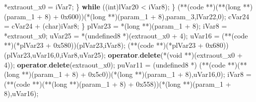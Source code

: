 \documentclass[
]{article}
\newenvironment{Shaded}{}{}
\newcommand{\BaseNTok}[1]{\textcolor[rgb]{0.25,0.63,0.44}{#1}}
\newcommand{\ControlFlowTok}[1]{\textcolor[rgb]{0.00,0.44,0.13}{\textbf{#1}}}
\newcommand{\DataTypeTok}[1]{\textcolor[rgb]{0.56,0.13,0.00}{#1}}
\newcommand{\DecValTok}[1]{\textcolor[rgb]{0.25,0.63,0.44}{#1}}
\newcommand{\KeywordTok}[1]{\textcolor[rgb]{0.00,0.44,0.13}{\textbf{#1}}}
\newcommand{\NormalTok}[1]{#1}
\newcommand{\OperatorTok}[1]{\textcolor[rgb]{0.40,0.40,0.40}{#1}}
\begin{document}
\begin{Shaded}
\begin{Highlighting}[]
        \OperatorTok{*}\NormalTok{extraout\_x0 }\OperatorTok{=}\NormalTok{ iVar7}\OperatorTok{;}
      \OperatorTok{\}} \ControlFlowTok{while} \OperatorTok{((}\DataTypeTok{int}\OperatorTok{)}\NormalTok{lVar20 }\OperatorTok{\textless{}}\NormalTok{ iVar8}\OperatorTok{);}
    \OperatorTok{\}}
    \OperatorTok{(**(}\NormalTok{code }\OperatorTok{**)(**(}\DataTypeTok{long} \OperatorTok{**)(}\NormalTok{param\_1 }\OperatorTok{+} \DecValTok{8}\OperatorTok{)} \OperatorTok{+} \BaseNTok{0x600}\OperatorTok{))(*(}\DataTypeTok{long} \OperatorTok{**)(}\NormalTok{param\_1 }\OperatorTok{+} \DecValTok{8}\OperatorTok{),}\NormalTok{param\_3}\OperatorTok{,}\NormalTok{lVar22}\OperatorTok{,}\DecValTok{0}\OperatorTok{);}
\NormalTok{    cVar24 }\OperatorTok{=}\NormalTok{ cVar24 }\OperatorTok{+} \OperatorTok{(}\DataTypeTok{char}\OperatorTok{)}\NormalTok{iVar8}\OperatorTok{;}
  \OperatorTok{\}}
\NormalTok{  plVar23 }\OperatorTok{=} \OperatorTok{*(}\DataTypeTok{long} \OperatorTok{**)(}\NormalTok{param\_1 }\OperatorTok{+} \DecValTok{8}\OperatorTok{);}
\NormalTok{  iVar8 }\OperatorTok{=} \OperatorTok{*}\NormalTok{extraout\_x0}\OperatorTok{;}
\NormalTok{  uVar25 }\OperatorTok{=} \OperatorTok{*(}\NormalTok{undefined8 }\OperatorTok{*)(}\NormalTok{extraout\_x0 }\OperatorTok{+} \DecValTok{4}\OperatorTok{);}
\NormalTok{  uVar16 }\OperatorTok{=} \OperatorTok{(**(}\NormalTok{code }\OperatorTok{**)(*}\NormalTok{plVar23 }\OperatorTok{+} \BaseNTok{0x580}\OperatorTok{))(}\NormalTok{plVar23}\OperatorTok{,}\NormalTok{iVar8}\OperatorTok{);}
  \OperatorTok{(**(}\NormalTok{code }\OperatorTok{**)(*}\NormalTok{plVar23 }\OperatorTok{+} \BaseNTok{0x680}\OperatorTok{))(}\NormalTok{plVar23}\OperatorTok{,}\NormalTok{uVar16}\OperatorTok{,}\DecValTok{0}\OperatorTok{,}\NormalTok{iVar8}\OperatorTok{,}\NormalTok{uVar25}\OperatorTok{);}
  \KeywordTok{operator}\OperatorTok{.}\KeywordTok{delete}\OperatorTok{(*(}\DataTypeTok{void} \OperatorTok{**)(}\NormalTok{extraout\_x0 }\OperatorTok{+} \DecValTok{4}\OperatorTok{));}
  \KeywordTok{operator}\OperatorTok{.}\KeywordTok{delete}\OperatorTok{(}\NormalTok{extraout\_x0}\OperatorTok{);}
\NormalTok{  puVar11 }\OperatorTok{=} \OperatorTok{(}\NormalTok{undefined8 }\OperatorTok{*)}
            \OperatorTok{(**(}\NormalTok{code }\OperatorTok{**)(**(}\DataTypeTok{long} \OperatorTok{**)(}\NormalTok{param\_1 }\OperatorTok{+} \DecValTok{8}\OperatorTok{)} \OperatorTok{+} \BaseNTok{0x5c0}\OperatorTok{))(*(}\DataTypeTok{long} \OperatorTok{**)(}\NormalTok{param\_1 }\OperatorTok{+} \DecValTok{8}\OperatorTok{),}\NormalTok{uVar16}\OperatorTok{,}\DecValTok{0}\OperatorTok{);}
\NormalTok{  iVar8 }\OperatorTok{=} \OperatorTok{(**(}\NormalTok{code }\OperatorTok{**)(**(}\DataTypeTok{long} \OperatorTok{**)(}\NormalTok{param\_1 }\OperatorTok{+} \DecValTok{8}\OperatorTok{)} \OperatorTok{+} \BaseNTok{0x558}\OperatorTok{))(*(}\DataTypeTok{long} \OperatorTok{**)(}\NormalTok{param\_1 }\OperatorTok{+} \DecValTok{8}\OperatorTok{),}\NormalTok{uVar16}\OperatorTok{);}

\end{Highlighting}
\end{Shaded}
\end{document}
